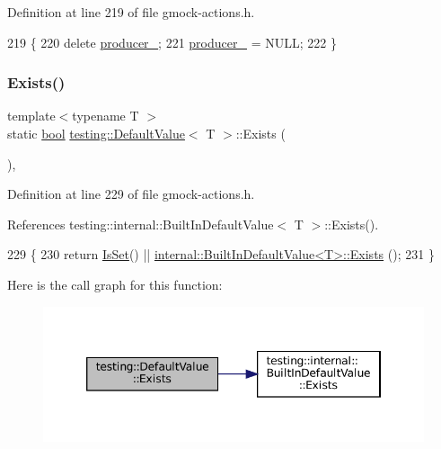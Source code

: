 Definition at line 219 of file gmock-\/actions.\+h.


\begin{DoxyCode}
219                       \{
220     \textcolor{keyword}{delete} \hyperlink{classtesting_1_1DefaultValue_a69d60d7538ccf71d9f47164320a3bf28}{producer\_};
221     \hyperlink{classtesting_1_1DefaultValue_a69d60d7538ccf71d9f47164320a3bf28}{producer\_} = NULL;
222   \}
\end{DoxyCode}
\mbox{\label{classtesting_1_1DefaultValue_aec1ff9b510af7dbb86c837fd2409fd70}} 
\subsubsection{\texorpdfstring{Exists()}{Exists()}}
{\footnotesize\ttfamily template$<$typename T $>$ \\
static \hyperlink{classbool}{bool} \hyperlink{classtesting_1_1DefaultValue}{testing\+::\+Default\+Value}$<$ T $>$\+::Exists (\begin{DoxyParamCaption}{ }\end{DoxyParamCaption})\hspace{0.3cm}{\ttfamily [inline]}, {\ttfamily [static]}}



Definition at line 229 of file gmock-\/actions.\+h.



References testing\+::internal\+::\+Built\+In\+Default\+Value$<$ T $>$\+::\+Exists().


\begin{DoxyCode}
229                        \{
230     \textcolor{keywordflow}{return} \hyperlink{classtesting_1_1DefaultValue_ad49febe2c944cbbd06451ba7d0366ca1}{IsSet}() || \hyperlink{classtesting_1_1internal_1_1BuiltInDefaultValue_a35207bc20a493b0efb3980eb9a08dd2f}{internal::BuiltInDefaultValue<T>::Exists}
      ();
231   \}
\end{DoxyCode}
Here is the call graph for this function\+:
\nopagebreak
\begin{figure}[H]
\begin{center}
\leavevmode
\includegraphics[width=346pt]{classtesting_1_1DefaultValue_aec1ff9b510af7dbb86c837fd2409fd70_cgraph}
\end{center}
\end{figure}
\mbox{\label{classtesting_1_1DefaultValue_a4dc6dfee4cbc9cdb36f5c9cde5cf2b83}} 
